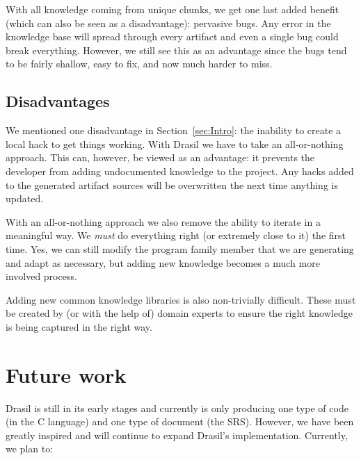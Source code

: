 \documentclass[preprint, 10pt]{sigplanconf}
\begin{document}
With all knowledge coming from unique chunks, we get one last added benefit
(which can also be seen as a disadvantage): pervasive bugs. Any error in the
knowledge base will spread through every artifact and even a single bug could
break everything. However, we still see this as an advantage since the bugs tend
to be fairly shallow, easy to fix, and now much harder to miss.

\subsection{Disadvantages}
\label{subsec:disadvantages}

We mentioned one disadvantage in Section~\ref{sec:Intro}: the inability to
create a local hack to get things working. With Drasil we have to take an
all-or-nothing approach. This can, however, be viewed as an advantage: it
prevents the developer from adding undocumented knowledge to the project. Any
hacks added to the generated artifact sources will be overwritten the next time
anything is updated.

With an all-or-nothing approach we also remove the ability to iterate in a
meaningful way. We \emph{must} do everything right (or extremely close to it)
the first time. Yes, we can still modify the program family member that we are
generating and adapt as necessary, but adding new knowledge becomes a much
more involved process.

Adding new common knowledge libraries is also non-trivially difficult. These
must be created by (or with the help of) domain experts to ensure the right
knowledge is being captured in the right way.

\section{Future work}
\label{sec:fw}

Drasil is still in its early stages and currently is only producing one type of
code (in the C language) and one type of document (the SRS). However, we have
been greatly inspired and will continue to expand Drasil's implementation.
Currently, we plan to:
\end{document}
